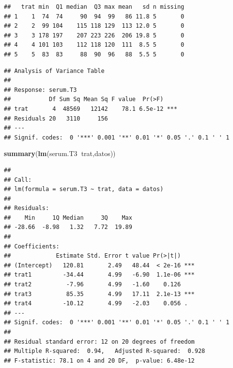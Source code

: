 \documentclass[]{book}
\newenvironment{Shaded}{\begin{snugshade}}{\end{snugshade}}
\newcommand{\KeywordTok}[1]{\textcolor[rgb]{0.13,0.29,0.53}{\textbf{#1}}}
\newcommand{\OperatorTok}[1]{\textcolor[rgb]{0.81,0.36,0.00}{\textbf{#1}}}
\newcommand{\NormalTok}[1]{#1}
\begin{document}
\begin{verbatim}
##   trat min  Q1 median  Q3 max mean   sd n missing
## 1    1  74  74     90  94  99   86 11.8 5       0
## 2    2  99 104    115 118 129  113 12.0 5       0
## 3    3 178 197    207 223 226  206 19.8 5       0
## 4    4 101 103    112 118 120  111  8.5 5       0
## 5    5  83  83     88  90  96   88  5.5 5       0
\end{verbatim}

\begin{Shaded}
\end{Shaded}

\begin{verbatim}
## Analysis of Variance Table
## 
## Response: serum.T3
##           Df Sum Sq Mean Sq F value  Pr(>F)    
## trat       4  48569   12142    78.1 6.5e-12 ***
## Residuals 20   3110     156                    
## ---
## Signif. codes:  0 '***' 0.001 '**' 0.01 '*' 0.05 '.' 0.1 ' ' 1
\end{verbatim}

\begin{Shaded}
\begin{Highlighting}[]
\KeywordTok{summary}\NormalTok{(}\KeywordTok{lm}\NormalTok{(serum.T3}\OperatorTok{~}\NormalTok{trat,datos))}
\end{Highlighting}
\end{Shaded}

\begin{verbatim}
## 
## Call:
## lm(formula = serum.T3 ~ trat, data = datos)
## 
## Residuals:
##    Min     1Q Median     3Q    Max 
## -28.66  -8.98   1.32   7.72  19.89 
## 
## Coefficients:
##             Estimate Std. Error t value Pr(>|t|)    
## (Intercept)   120.81       2.49   48.44  < 2e-16 ***
## trat1         -34.44       4.99   -6.90  1.1e-06 ***
## trat2          -7.96       4.99   -1.60    0.126    
## trat3          85.35       4.99   17.11  2.1e-13 ***
## trat4         -10.12       4.99   -2.03    0.056 .  
## ---
## Signif. codes:  0 '***' 0.001 '**' 0.01 '*' 0.05 '.' 0.1 ' ' 1
## 
## Residual standard error: 12 on 20 degrees of freedom
## Multiple R-squared:  0.94,   Adjusted R-squared:  0.928 
## F-statistic: 78.1 on 4 and 20 DF,  p-value: 6.48e-12
\end{verbatim}
\end{document}
